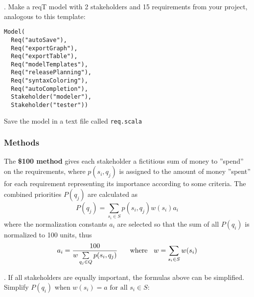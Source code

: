 \documentclass[11pt]{article}
\begin{document}
  \begin{framed}
 . Make a reqT model with 2 stakeholders and 15 requirements from your project, analogous to this template: 
 
\begin{lstlisting}
Model(
  Req("autoSave"),
  Req("exportGraph"), 
  Req("exportTable"), 
  Req("modelTemplates"), 
  Req("releasePlanning"), 
  Req("syntaxColoring"), 
  Req("autoCompletion"), 
  Stakeholder("modeler"),
  Stakeholder("tester"))     
\end{lstlisting}
Save the model in a text file called \verb+req.scala+
\end{framed}
 
\subsubsection{Methods}\label{section:priomethods}

\noindent The {\bf \$100 method} gives each stakeholder a fictitious sum of money to ''spend'' on the requirements, where $p(s_i, q_j)$ is assigned to the amount of money ''spent'' for each requirement representing its importance according to some criteria. The combined priorities $P(q_j)$ are calculated as  
\begin{displaymath}
P(q_j) = \sum\limits_{s_i \in S} p(s_i, q_j) w(s_i) a_i
\end{displaymath}
where the normalization constants $a_i$ are selected so that the sum of all $P(q_i)$ is normalized to 100 units, thus 
\begin{displaymath}
a_i = \frac{100}{   w \sum\limits_{q_j \in Q} p(s_i, q_j)} \text{ \hspace{4mm} where \hspace{2mm}}
w = \sum\limits_{s_i \in S} w(s_i)
\end{displaymath} 

\begin{framed}
. If all stakeholders are equally important, the formulas above can be simplified. Simplify $P(q_i)$ when $w(s_i) = a \text{ for all  } s_i \in S$: \newline\newline\newline\newline    \underline{\hspace{11cm}}
 \end{framed}
\end{document}
